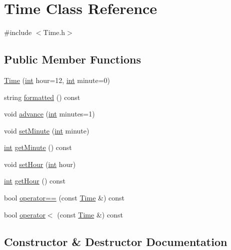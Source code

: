 \hypertarget{classTime}{}\section{Time Class Reference}
\label{classTime}


{\ttfamily \#include $<$Time.\+h$>$}

\subsection*{Public Member Functions}
\begin{DoxyCompactItemize}
\item 
\hyperlink{classTime_a90d3b9a3fb4516e7ccb4c60deba03807}{Time} (\hyperlink{CMakeCache_8txt_a79a3d8790b2588b09777910863574e09}{int} hour=12, \hyperlink{CMakeCache_8txt_a79a3d8790b2588b09777910863574e09}{int} minute=0)
\item 
string \hyperlink{classTime_aeeb2d2b5a624d0d78b7f5d146d0682f5}{formatted} () const 
\item 
void \hyperlink{classTime_a41c94422f10c95daab849b9c20afdeba}{advance} (\hyperlink{CMakeCache_8txt_a79a3d8790b2588b09777910863574e09}{int} minutes=1)
\item 
void \hyperlink{classTime_a9c53c93d10be3785c85449186beb6b6a}{set\+Minute} (\hyperlink{CMakeCache_8txt_a79a3d8790b2588b09777910863574e09}{int} minute)
\item 
\hyperlink{CMakeCache_8txt_a79a3d8790b2588b09777910863574e09}{int} \hyperlink{classTime_a6ccac73be7aacc12410cea6b3d216357}{get\+Minute} () const 
\item 
void \hyperlink{classTime_ab77d5f9f5fa8582d23a70d418ab6a182}{set\+Hour} (\hyperlink{CMakeCache_8txt_a79a3d8790b2588b09777910863574e09}{int} hour)
\item 
\hyperlink{CMakeCache_8txt_a79a3d8790b2588b09777910863574e09}{int} \hyperlink{classTime_a4e9d93c2aaaac84b0a49f44184968860}{get\+Hour} () const 
\item 
bool \hyperlink{classTime_adeb3173efb2cb16bf361db0204a85c7c}{operator==} (const \hyperlink{classTime}{Time} \&) const 
\item 
bool \hyperlink{classTime_aa668f56a3ee77c147e7dc76bf1ad89f1}{operator$<$} (const \hyperlink{classTime}{Time} \&) const 
\end{DoxyCompactItemize}


\subsection{Constructor \& Destructor Documentation}
